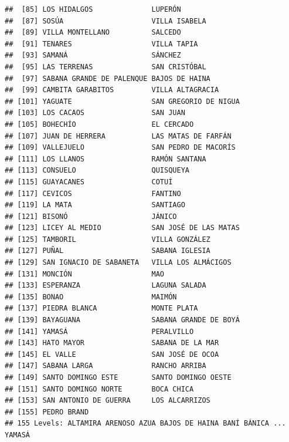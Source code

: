 \documentclass[11pt,]{article}
\newenvironment{Shaded}{\begin{snugshade}}{\end{snugshade}}
\newcommand{\KeywordTok}[1]{\textcolor[rgb]{0.13,0.29,0.53}{\textbf{#1}}}
\newcommand{\DecValTok}[1]{\textcolor[rgb]{0.00,0.00,0.81}{#1}}
\newcommand{\StringTok}[1]{\textcolor[rgb]{0.31,0.60,0.02}{#1}}
\newcommand{\OperatorTok}[1]{\textcolor[rgb]{0.81,0.36,0.00}{\textbf{#1}}}
\newcommand{\NormalTok}[1]{#1}
\begin{document}
\begin{verbatim}
##  [85] LOS HIDALGOS              LUPERÓN                  
##  [87] SOSÚA                     VILLA ISABELA            
##  [89] VILLA MONTELLANO          SALCEDO                  
##  [91] TENARES                   VILLA TAPIA              
##  [93] SAMANÁ                    SÁNCHEZ                  
##  [95] LAS TERRENAS              SAN CRISTÓBAL            
##  [97] SABANA GRANDE DE PALENQUE BAJOS DE HAINA           
##  [99] CAMBITA GARABITOS         VILLA ALTAGRACIA         
## [101] YAGUATE                   SAN GREGORIO DE NIGUA    
## [103] LOS CACAOS                SAN JUAN                 
## [105] BOHECHÍO                  EL CERCADO               
## [107] JUAN DE HERRERA           LAS MATAS DE FARFÁN      
## [109] VALLEJUELO                SAN PEDRO DE MACORÍS     
## [111] LOS LLANOS                RAMÓN SANTANA            
## [113] CONSUELO                  QUISQUEYA                
## [115] GUAYACANES                COTUÍ                    
## [117] CEVICOS                   FANTINO                  
## [119] LA MATA                   SANTIAGO                 
## [121] BISONÓ                    JÁNICO                   
## [123] LICEY AL MEDIO            SAN JOSÉ DE LAS MATAS    
## [125] TAMBORIL                  VILLA GONZÁLEZ           
## [127] PUÑAL                     SABANA IGLESIA           
## [129] SAN IGNACIO DE SABANETA   VILLA LOS ALMÁCIGOS      
## [131] MONCIÓN                   MAO                      
## [133] ESPERANZA                 LAGUNA SALADA            
## [135] BONAO                     MAIMÓN                   
## [137] PIEDRA BLANCA             MONTE PLATA              
## [139] BAYAGUANA                 SABANA GRANDE DE BOYÁ    
## [141] YAMASÁ                    PERALVILLO               
## [143] HATO MAYOR                SABANA DE LA MAR         
## [145] EL VALLE                  SAN JOSÉ DE OCOA         
## [147] SABANA LARGA              RANCHO ARRIBA            
## [149] SANTO DOMINGO ESTE        SANTO DOMINGO OESTE      
## [151] SANTO DOMINGO NORTE       BOCA CHICA               
## [153] SAN ANTONIO DE GUERRA     LOS ALCARRIZOS           
## [155] PEDRO BRAND              
## 155 Levels: ALTAMIRA ARENOSO AZUA BAJOS DE HAINA BANÍ BÁNICA ... YAMASÁ
\end{verbatim}

\begin{Shaded}
\end{Shaded}
\end{document}
